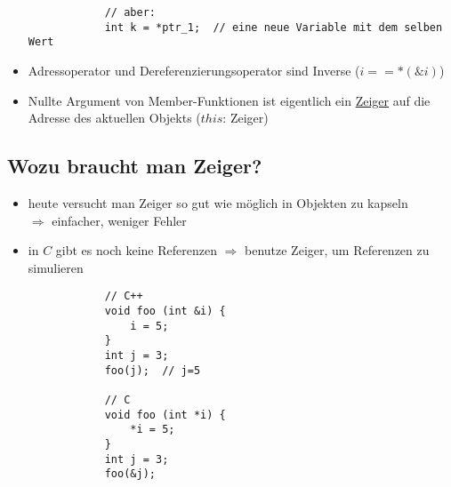 \documentclass{article}
\begin{document}
\begin{itemize}
\begin{lstlisting}
			// aber: 
			int k = *ptr_1;  // eine neue Variable mit dem selben Wert
		\end{lstlisting}
		\item Adressoperator und Dereferenzierungsoperator sind Inverse ($i==*(\&i)$)
		\item Nullte Argument von Member-Funktionen ist eigentlich ein \underline{Zeiger} auf die Adresse des aktuellen Objekts ($this$: Zeiger)
	\end{itemize}

\subsection*{Wozu braucht man Zeiger?}
	\begin{itemize}
		\item heute versucht man Zeiger so gut wie möglich in Objekten zu kapseln \\
		$\Rightarrow $ einfacher, weniger Fehler
		\item in $C$ gibt es noch keine Referenzen $\Rightarrow$ benutze Zeiger, um Referenzen zu simulieren
		\begin{lstlisting}
			// C++
			void foo (int &i) {
				i = 5;
			}
			int j = 3;
			foo(j);  // j=5

			// C
			void foo (int *i) {
				*i = 5;
			}
			int j = 3;
			foo(&j);
		\end{lstlisting}
	\end{itemize}
\end{document}
